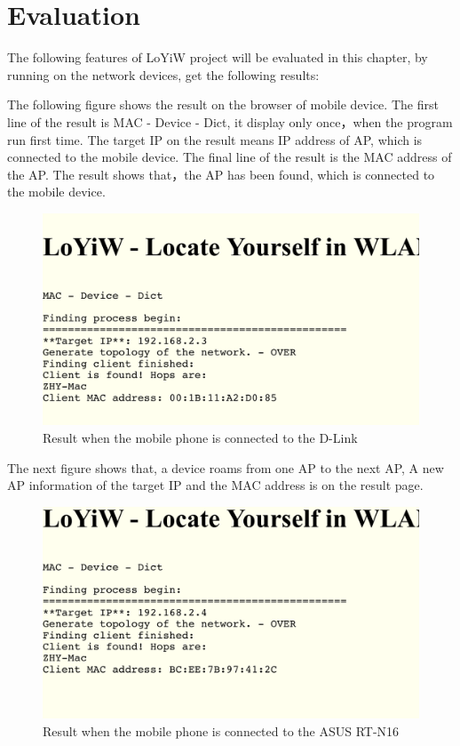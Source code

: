 \newpage
\chapter{Evaluation}

The following features of LoYiW project will be evaluated in this chapter, by running on the network devices, get the following results: 

The following figure shows the result on the browser of mobile device. The first line of the result is MAC - Device - Dict, it display only once，when the program run first time. The target IP on the result means IP address of AP, which is connected to the mobile device. The final line of the result is the MAC address of the AP. The result shows that，the AP has been found, which is connected to the mobile device.

\begin{figure}[!ht]
	\includegraphics{images/loyiw-run1}
	\caption{Result when the mobile phone is connected to the D-Link}
\end{figure}

The next figure shows that, a device roams from one AP to the next AP,  A new AP information of the target IP and the MAC address is on the result page.

\begin{figure}[!ht]
	\includegraphics{images/loyiw-run2}
	\caption{Result when the mobile phone is connected to the ASUS RT-N16}
\end{figure}



